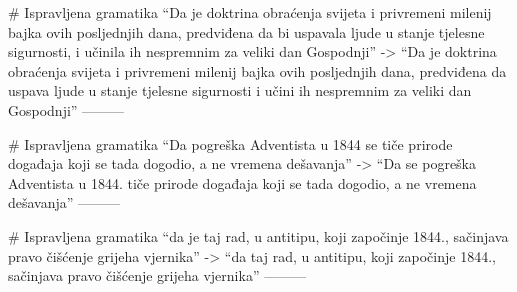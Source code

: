 # Ispravljena gramatika
“Da je doktrina obraćenja svijeta i privremeni milenij bajka ovih posljednjih dana, predviđena da bi uspavala ljude u stanje tjelesne sigurnosti, i učinila ih nespremnim za veliki dan Gospodnji”
->
“Da je doktrina obraćenja svijeta i privremeni milenij bajka ovih posljednjih dana, predviđena da uspava ljude u stanje tjelesne sigurnosti i učini ih nespremnim za veliki dan Gospodnji”
---------

# Ispravljena gramatika
“Da pogreška Adventista u 1844 se tiče prirode događaja koji se tada dogodio, a ne vremena dešavanja”
->
“Da se pogreška Adventista u 1844. tiče prirode događaja koji se tada dogodio, a ne vremena dešavanja”
---------

# Ispravljena gramatika
“da je taj rad, u antitipu, koji započinje 1844., sačinjava pravo čišćenje grijeha vjernika”
->
“da taj rad, u antitipu, koji započinje 1844., sačinjava pravo čišćenje grijeha vjernika”
---------